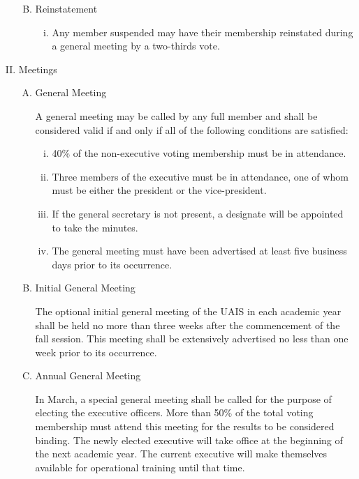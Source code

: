 \documentclass[11pt]{article}
\begin{document}
\begin{enumerate}[I.]
\begin{enumerate}[A)]
\begin{enumerate}[i)]
        \end{enumerate}
      \item Reinstatement
        \begin{enumerate}[i)]
          \item Any member suspended may have their membership reinstated during a general meeting by a two-thirds vote.
        \end{enumerate}
    \end{enumerate}
  \item Meetings
    \begin{enumerate}[A)]
      \item General Meeting

      A general meeting may be called by any full member and shall be
        considered valid if and only if all of the following conditions are
        satisfied:
        \begin{enumerate}[i)]
          \item 40\% of the non-executive voting membership must be in
            attendance.
          \item Three members of the executive must be in attendance, one of
            whom must be either the president or the vice-president.
          \item If the general secretary is not present, a designate will be appointed to take the minutes.
          \item The general meeting must have been advertised at least five
            business days prior to its occurrence.
        \end{enumerate}
      \item Initial General Meeting

      The optional initial general meeting of the UAIS in each academic year shall be held no more than three weeks after the commencement of the fall session. This meeting shall be extensively advertised no less than one week prior to its occurrence.

      \item Annual General Meeting

      In March, a special general meeting shall be called for the purpose of
        electing the executive officers. More than 50\% of the total voting
        membership must attend this meeting for the results to be considered
        binding. The newly elected executive will take office at the beginning of the next academic year. The current executive will make themselves available for operational training until that time.


\end{enumerate}
\end{enumerate}
\end{document}
